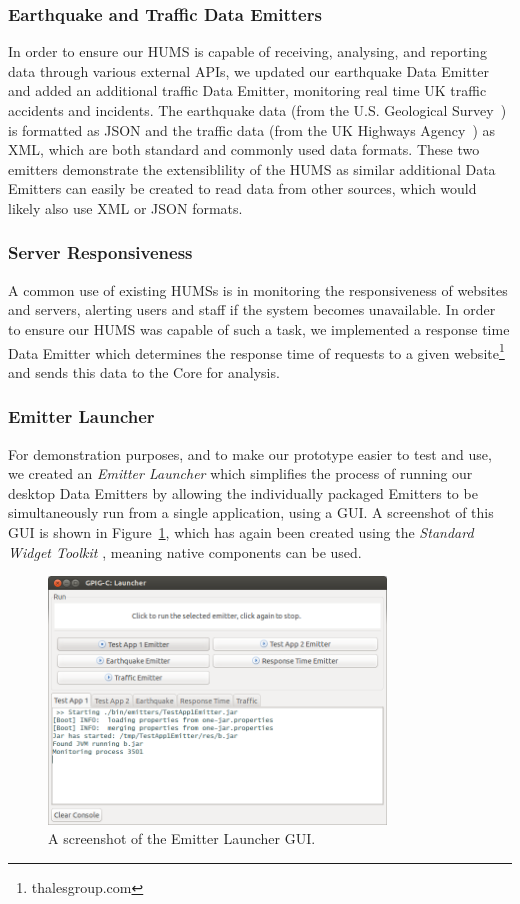\documentclass[10pt,a4paper]{article}
\begin{document}
\subsubsection{Earthquake and Traffic Data Emitters}
In order to ensure our HUMS is capable of receiving, analysing, and reporting data through various external APIs, we updated our earthquake Data Emitter and added an additional traffic Data Emitter, monitoring real time UK traffic accidents and incidents. The earthquake data (from the U.S. Geological Survey~\cite{us_geo}) is formatted as JSON and the traffic data (from the UK Highways Agency~\cite{ha_traffic}) as XML, which are both standard and commonly used data formats. These two emitters demonstrate the extensiblility of the HUMS as similar additional Data Emitters can easily be created to read data from other sources, which would likely also use XML or JSON formats.

\subsubsection{Server Responsiveness}
A common use of existing HUMSs is in monitoring the responsiveness of websites and servers, alerting users and staff if the system becomes unavailable. In order to ensure our HUMS was capable of such a task, we implemented a response time Data Emitter which determines the response time of requests to a given website\footnote{thalesgroup.com} and sends this data to the Core for analysis.

\subsubsection{Emitter Launcher}
For demonstration purposes, and to make our prototype easier to test and use, we created an \emph{Emitter Launcher} which simplifies the process of running our desktop Data Emitters by allowing the individually packaged Emitters to be simultaneously run from a single application, using a GUI. A screenshot of this GUI is shown in Figure~\ref{fig:launcherGUI}, which has again been created using the \emph{Standard Widget Toolkit} \cite{swt}, meaning native components can be used.
 
\begin{figure}[ht]
\centering
\includegraphics*[width=0.8\textwidth]{images/launcherGUI.png}
\caption{A screenshot of the Emitter Launcher GUI.}
\label{fig:launcherGUI}
\end{figure}
\end{document}
